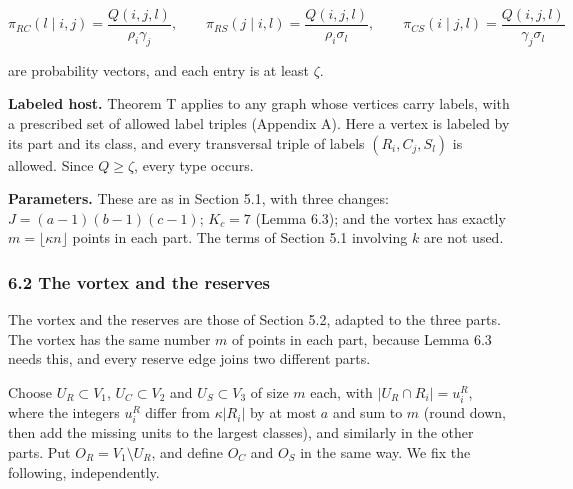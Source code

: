 \documentclass[english,11pt,a4paper]{article}
\begin{document}
\nopagebreak[4]
\[\pi_{RC}(l\mid i,j)=\frac{Q(i,j,l)}{\rho_i\gamma_j},\qquad
\pi_{RS}(j\mid i,l)=\frac{Q(i,j,l)}{\rho_i\sigma_l},\qquad
\pi_{CS}(i\mid j,l)=\frac{Q(i,j,l)}{\gamma_j\sigma_l}\]

are probability vectors, and each entry is at least \(\zeta\).

\textbf{Labeled host.} Theorem T applies to any graph whose vertices carry labels, with a prescribed set of allowed label triples (Appendix A). Here a vertex is labeled by its part and its class, and every transversal triple of labels \((R_i,C_j,S_l)\) is allowed. Since \(Q\ge\zeta\), every type occurs.

\textbf{Parameters.} These are as in Section 5.1, with three changes: \(J=(a-1)(b-1)(c-1)\); \(K_c=7\) (Lemma 6.3); and the vortex has exactly \(m=\lfloor\kappa n\rfloor\) points in each part. The terms of Section 5.1 involving \(k\) are not used.

\subsubsection{6.2 The vortex and the reserves}\label{the-vortex-and-the-reserves-1}

The vortex and the reserves are those of Section 5.2, adapted to the three parts. The vortex has the same number \(m\) of points in each part, because Lemma 6.3 needs this, and every reserve edge joins two different parts.

Choose \(U_R\subset V_1\), \(U_C\subset V_2\) and \(U_S\subset V_3\) of size \(m\) each, with \(|U_R\cap R_i|=u^R_i\), where the integers \(u^R_i\) differ from \(\kappa|R_i|\) by at most \(a\) and sum to \(m\) (round down, then add the missing units to the largest classes), and similarly in the other parts. Put \(O_R=V_1\setminus U_R\), and define \(O_C\) and \(O_S\) in the same way. We fix the following, independently.
\end{document}
